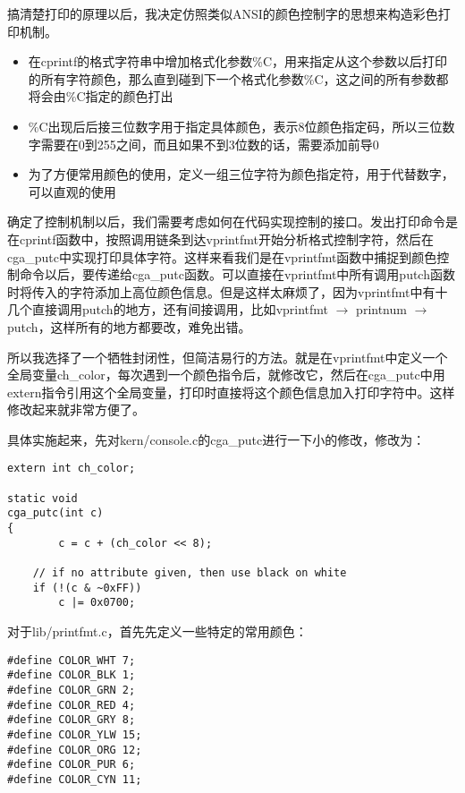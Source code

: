 \documentclass{article}
\newcommand{\funcname}[1]{{\ttfamily \small #1}}
\begin{document}
\begin{CJK*}{UTF8}{gkai}
搞清楚打印的原理以后，我决定仿照类似ANSI的颜色控制字的思想来构造彩色打印机制。

\begin{itemize}
    \item{在\funcname{cprintf}的格式字符串中增加格式化参数\%C，用来指定从这个参数以后打印的所有字符颜色，那么直到碰到下一个格式化参数\%C，这之间的所有参数都将会由\%C指定的颜色打出}
    \item{\%C出现后后接三位数字用于指定具体颜色，表示8位颜色指定码，所以三位数字需要在0到255之间，而且如果不到3位数的话，需要添加前导0}
    \item{为了方便常用颜色的使用，定义一组三位字符为颜色指定符，用于代替数字，可以直观的使用}
\end{itemize}

确定了控制机制以后，我们需要考虑如何在代码实现控制的接口。发出打印命令是在\funcname{cprintf}函数中，按照调用链条到达\funcname{vprintfmt}开始分析格式控制字符，然后在\funcname{cga\_putc}中实现打印具体字符。这样来看我们是在\funcname{vprintfmt}函数中捕捉到颜色控制命令以后，要传递给\funcname{cga\_putc}函数。可以直接在\funcname{vprintfmt}中所有调用\funcname{putch}函数时将传入的字符添加上高位颜色信息。但是这样太麻烦了，因为\funcname{vprintfmt}中有十几个直接调用\funcname{putch}的地方，还有间接调用，比如\funcname{vprintfmt} $\rightarrow$ \funcname{printnum} $\rightarrow$ \funcname{putch}，这样所有的地方都要改，难免出错。

所以我选择了一个牺牲封闭性，但简洁易行的方法。就是在\funcname{vprintfmt}中定义一个全局变量ch\_color，每次遇到一个颜色指令后，就修改它，然后在\funcname{cga\_putc}中用extern指令引用这个全局变量，打印时直接将这个颜色信息加入打印字符中。这样修改起来就非常方便了。

具体实施起来，先对kern/console.c的\funcname{cga\_putc}进行一下小的修改，修改为：

\begin{lstlisting}[style=ccode, title={\scriptsize \ttfamily \bfseries kern/console.c}]
extern int ch_color;

static void
cga_putc(int c)
{
        c = c + (ch_color << 8);

	// if no attribute given, then use black on white
	if (!(c & ~0xFF))
		c |= 0x0700;
\end{lstlisting}

对于lib/printfmt.c，首先先定义一些特定的常用颜色：


\begin{lstlisting}[style=ccode, title={\scriptsize \ttfamily \bfseries lib/printfmt.c}]
#define COLOR_WHT 7;
#define COLOR_BLK 1;
#define COLOR_GRN 2;
#define COLOR_RED 4;
#define COLOR_GRY 8;
#define COLOR_YLW 15;
#define COLOR_ORG 12;
#define COLOR_PUR 6;
#define COLOR_CYN 11;


\end{lstlisting}
\end{CJK*}
\end{document}
